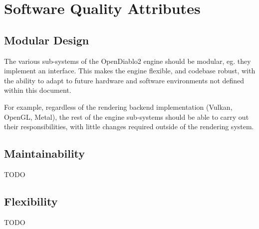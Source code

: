 \section{Software Quality Attributes} \label{sec:software_quality_attributes}


\subsection{Modular Design}
The various sub-systems of the OpenDiablo2 engine should be modular, eg. they
implement an interface. This makes the engine flexible, and codebase robust,
with the ability to adapt to future hardware and software environments not defined
within this document.

For example, regardless of the rendering backend implementation (Vulkan, OpenGL, 
Metal), the rest of the engine sub-systems should be able to carry out their
responsibilities, with little changes required outside of the rendering system.

\subsection{Maintainability}
TODO

\subsection{Flexibility}
TODO
